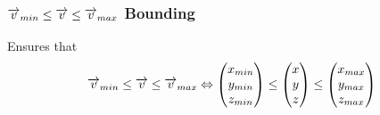 \subsubsection*{$\overrightarrow{v}_{min} \leq \overrightarrow{v} \leq \overrightarrow{v}_{max}$ Bounding}
Ensures that
\begin{equation}
\overrightarrow{v}_{min} \leq \overrightarrow{v} \leq \overrightarrow{v}_{max} \Leftrightarrow \begin{pmatrix} x_{min} \\ y_{min} \\ z_{min} \end{pmatrix} \leq \begin{pmatrix} x \\ y \\ z \end{pmatrix} \leq \begin{pmatrix} x_{max} \\ y_{max} \\ z_{max} \end{pmatrix}
\end{equation}
